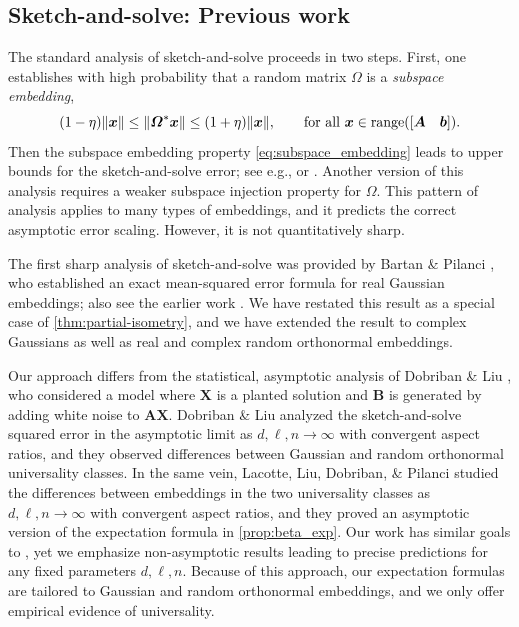 \documentclass[11pt]{article}
\DeclareMathOperator{\range}{range}
\newcommand{\mat}[1]{\boldsymbol{#1}}
\renewcommand{\vec}[1]{\boldsymbol{#1}}
\newcommand{\norm}[1]{\mleft\| #1 \mright\|}
\theoremstyle{definition}
\numberwithin{equation}{section}
\begin{document}
\subsection{Sketch-and-solve: Previous work} \label{sec:sketch-solve-previous}
The standard analysis of sketch-and-solve proceeds in two steps.
First, one establishes with high probability that a random matrix $\mat{\varOmega}$ is a \emph{subspace embedding},
\begin{equation}
\label{eq:subspace_embedding}
    (1 - \eta) \norm{\vec{x}} \leq \norm{\mat{\varOmega}^* \vec{x}} \leq (1 + \eta) \norm{\vec{x}},
    \qquad \text{for all } \vec{x} \in \range([\begin{matrix} \mat{A} & \vec{b} \end{matrix}]).
\end{equation}
Then the subspace embedding property \cref{eq:subspace_embedding} leads to upper bounds for the sketch-and-solve error; see e.g., \cite[Prop.~5.3]{KT24} or \cite[Thm.~C.2]{Epp25a}.
Another version of this analysis \cite{DMMS11,CEMT25} requires a weaker subspace injection property for $\mat{\varOmega}$.
This pattern of analysis applies to many types of embeddings, and it predicts the correct asymptotic error scaling.
However, it is not quantitatively sharp.

The first sharp analysis of sketch-and-solve was provided by Bartan \& Pilanci \cite[Lem.~2.1]{BP20}, who established an exact mean-squared error formula for real Gaussian embeddings; also see the earlier work \cite{AAR21}.
We have restated this result as a special case of \cref{thm:partial-isometry}, and we have extended the result to complex Gaussians as well as real and complex random orthonormal embeddings.

Our approach differs from the statistical, asymptotic analysis of Dobriban \& Liu \cite{DL19a}, who considered a model where $\mat{X}$ is a planted solution and $\mat{B}$ is generated by adding white noise to $\mat{A}\mat{X}$.
Dobriban \& Liu analyzed the sketch-and-solve squared error in the asymptotic limit as $d,\ell,n\to\infty$ with convergent aspect ratios, and they observed differences between Gaussian and random orthonormal universality classes.
In the same vein, Lacotte, Liu, Dobriban, \& Pilanci \cite{LLDP20a} studied the differences between embeddings in the two universality classes as $d,\ell,n\to\infty$ with convergent aspect ratios, and they proved an asymptotic version of the expectation formula in \cref{prop:beta_exp}.
Our work has similar goals to \cite{DL19a,LLDP20a}, yet we emphasize non-asymptotic results leading to precise predictions for any fixed parameters $d,\ell,n$.
Because of this approach, our expectation formulas are tailored to Gaussian and random orthonormal embeddings, and we only offer empirical evidence of universality.
\end{document}
